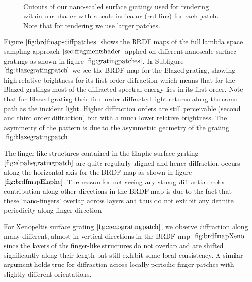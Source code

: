 \begin{figure}[H]
  \centering
~
~

\caption{Cutouts of our nano-scaled surface gratings used for rendering within our shader with a scale indicator (red line) for each patch. Note that for rendering we use larger patches.}
\label{fig:gratingpatches}
\end{figure}

Figure $\ref{fig:brdfmapsdiffpatches}$ shows the BRDF maps of the full lambda space sampling approach $\ref{sec:fragmentshader}$ applied on different nanoscale surface gratings as shown in figure $\ref{fig:gratingpatches}$. In Subfigure $\ref{fig:blazegratingpatch}$ we see the BRDF map for the Blazed grating, showing high relative brightness for its first order diffraction which means that for the Blazed gratings most of the diffracted spectral energy lies in its first order. Note that for Blazed grating their first-order diffracted light returns along the same path as the incident light. Higher diffraction orders are still perceivable (second and third order diffraction) but with a much lower relative brightness. The asymmetry of the pattern is due to the asymmetric geometry of the grating $\ref{fig:blazegratingpatch}$.

The finger-like structures contained in the Elaphe surface grating $\ref{fig:elpahegratingpatch}$ are quite regularly aligned and hence diffraction occurs along the horizontal axis for the BRDF map as shown in figure $\ref{fig:brdfmapElaphe}$. The reason for not seeing any strong diffraction color contribution along other directions in the BRDF map is due to the fact that these ‘nano-fingers’ overlap across layers and thus do not exhibit any definite periodicity along finger direction.

For Xenopeltis surface grating $\ref{fig:xenogratingpatch}$, we observe diffraction along many different, almost in vertical directions in the BRDF map $\ref{fig:brdfmapXeno}$ since the layers of the finger-like structures do not overlap and are shifted significantly along their length but still exhibit some local consistency. A similar argument holds true for diffraction across locally periodic finger patches with slightly different orientations. 


